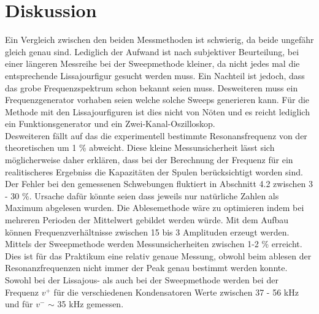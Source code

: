 \section{Diskussion}
\label{sec:Diskussion}
Ein Vergleich zwischen den beiden Messmethoden ist schwierig, da beide ungefähr gleich genau sind. Lediglich der Aufwand ist nach subjektiver Beurteilung, bei einer längeren Messreihe bei der Sweepmethode kleiner, da nicht jedes mal die entsprechende Lissajourfigur gesucht werden muss. Ein Nachteil ist jedoch, dass das grobe Frequenzspektrum schon bekannt seien muss. Desweiteren muss ein Frequenzgenerator vorhaben seien welche solche Sweeps generieren kann. Für die Methode mit den Lissajourfiguren ist dies nicht von Nöten und es reicht lediglich ein Funktionsgenerator und ein Zwei-Kanal-Oszilloskop.\\
Desweiteren fällt auf das die experimentell bestimmte Resonansfrequenz von der theoretischen um 1 \% abweicht. Diese kleine Messunsicherheit lässt sich möglicherweise daher erklären, dass bei der Berechnung der Frequenz für ein realitischeres Ergebniss die Kapazitäten der Spulen berücksichtigt worden sind. \\
Der Fehler bei den gemessenen Schwebungen fluktiert in Abschnitt 4.2 zwischen 3 - 30 \%. Ursache dafür könnte seien dass jeweils nur natürliche Zahlen als Maximum abgelesen wurden. Die Ablesemethode wäre zu optimieren indem bei mehreren Perioden der Mittelwert gebildet werden würde. Mit dem Aufbau können Frequenzverhältnisse zwischen 15 bis 3 Amplituden erzeugt werden.\\
Mittels der Sweepmethode werden Messunsicherheiten zwischen 1-2 \% erreicht. Dies ist für das Praktikum eine relativ genaue Messung, obwohl beim ablesen der Resonanzfrequenzen nicht immer der Peak genau bestimmt werden konnte. \\
Sowohl bei der Lissajous- als auch bei der Sweepmethode werden bei der Frequenz $v^+$ für die verschiedenen Kondensatoren Werte zwischen 37 - 56 kHz und für $v^-$ $\sim$ 35 kHz gemessen. 
